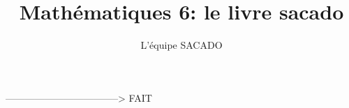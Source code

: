 





\title{Mathématiques 6\ieme : le livre sacado}
\author{L'équipe SACADO}



\parindent=0pt

\maketitle

%
%
%
%
%
%
%
%
 -----------------------------------> FAIT
%
%
%
%
%
